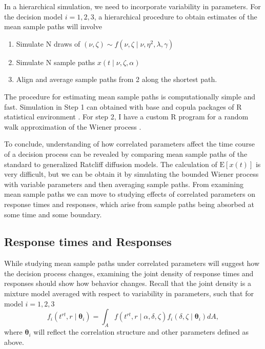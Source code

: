 \documentclass[12pt]{report}
\begin{document}
In a hierarchical simulation, we need to incorporate variability in parameters. For the decision model $i = 1, 2, 3$, a hierarchical procedure to obtain estimates of the mean sample paths will involve
\begin{enumerate}
\item Simulate N draws of $(\nu, \zeta) \sim f(\nu, \zeta \mid \nu, \eta^2, \lambda, \gamma)$
\item Simulate N sample paths $x(t \mid \nu, \zeta, \alpha)$
\item Align and average sample paths from 2 along the shortest path.
\end{enumerate}
The procedure for estimating mean sample paths is computationally simple and fast. Simulation in Step 1 can obtained with base and copula packages of R statistical environment \citep{HofKoj2013,R2014}. For step 2, I have a custom R program for a random walk approximation of the Wiener process \citep{TueMar2001}.   

To conclude, understanding of how correlated parameters affect the time course of a decision process can be revealed by comparing mean sample paths of the standard to generalized Ratcliff diffusion models. The calculation of $\mathrm{E}[x(t)]$ is very difficult, but we can be obtain it by simulating the bounded Wiener process with variable parameters and then averaging sample paths. From examining mean sample paths we can move to studying effects of correlated parameters on response times and responses, which arise from sample paths being absorbed at some time and some boundary.   

\subsection{Response times and Responses}

While studying mean sample paths under correlated parameters will suggest how the decision process changes, examining the joint density of response times and responses should show how behavior changes. Recall that the joint density is a mixture model averaged with respect to variability in parameters, such that for model $i = 1, 2, 3$
\begin{equation}
f_i(t^{rt}, r \mid \boldsymbol{\theta}_i) = \int_A f(t^{rt},r \mid \alpha, \delta, \zeta)f_i(\delta, \zeta \mid \boldsymbol{\theta}_i)dA, 
\end{equation}
where $\boldsymbol{\theta}_i$ will reflect the correlation structure and other parameters defined as above. 
\end{document}
